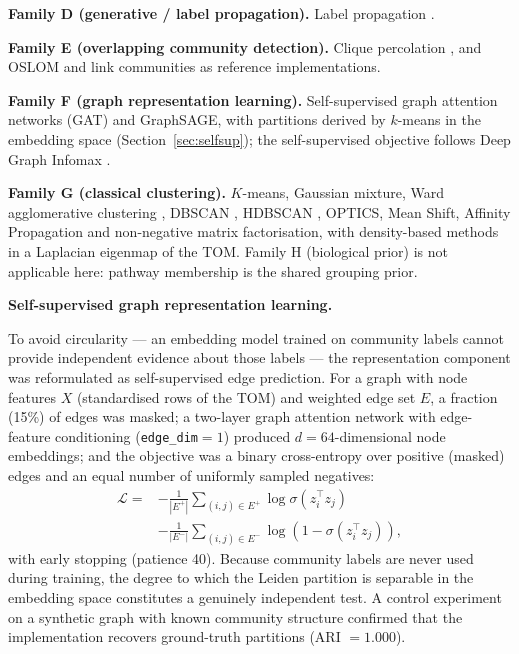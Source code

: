\documentclass[twocolumn,10pt,letterpaper]{article}
\begin{document}
\noindent\textbf{Family D (generative / label propagation).} Label propagation
\citep{raghavan2007lpa}.

\noindent\textbf{Family E (overlapping community detection).} Clique percolation
\citep{palla2005clique}, and OSLOM \citep{lancichinetti2011oslom} and link communities
\citep{ahn2010link} as reference implementations.

\noindent\textbf{Family F (graph representation learning).} Self-supervised graph attention
networks (GAT) \citep{velickovic2018gat} and GraphSAGE, with
partitions derived by $k$-means in the embedding space (Section~\ref{sec:selfsup}); the self-supervised objective follows Deep Graph Infomax \citep{velickovic2019dgi}.

\noindent\textbf{Family G (classical clustering).} $K$-means, Gaussian mixture, Ward
agglomerative clustering \citep{ward1963hierarchical}, DBSCAN \citep{ester1996dbscan},
HDBSCAN \citep{campello2013hdbscan}, OPTICS, Mean Shift, Affinity Propagation and
non-negative matrix factorisation, with density-based methods in a Laplacian eigenmap of the TOM. Family H (biological prior) is not applicable here: pathway membership
is the shared grouping prior.

\noindent\textbf{Self-supervised graph representation learning.} \label{sec:selfsup}

To avoid circularity --- an embedding model trained on community labels cannot provide
independent evidence about those labels --- the representation component was reformulated
as self-supervised edge prediction. For a graph with node features $X$ (standardised rows of
the TOM) and weighted edge set $E$, a fraction (15\%) of edges was masked; a two-layer
graph attention network with edge-feature conditioning (\texttt{edge\_dim}$=1$) produced
$d = 64$-dimensional node embeddings; and the objective was a binary cross-entropy over
positive (masked) edges and an equal number of uniformly sampled negatives:
\begin{equation}
\begin{split}
\mathcal{L} ={} &-\frac{1}{|E^{+}|}\sum_{(i,j)\in E^{+}}\log\sigma(z_i^{\top}z_j) \\
&-\frac{1}{|E^{-}|}\sum_{(i,j)\in E^{-}}\log\!\left(1-\sigma(z_i^{\top}z_j)\right),
\end{split}
\end{equation}
with early stopping (patience 40). Because community labels are never used during training,
the degree to which the Leiden partition is separable in the embedding space constitutes a
genuinely independent test. A control experiment on a synthetic graph with known community
structure confirmed that the implementation recovers ground-truth partitions (ARI $=1.000$).
\end{document}
